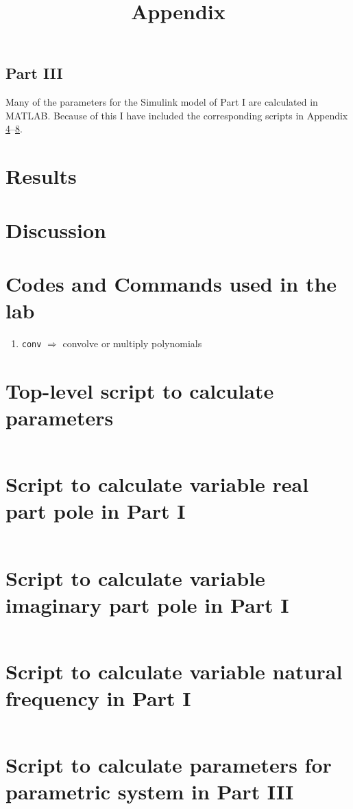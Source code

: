 \documentclass[11pt]{article}
\begin{document}
\begin{adjustwidth}{0.5in}{0in}
    \subsection{Part III}
    Many of the parameters for the Simulink model of Part I are calculated in MATLAB. Because of this I have included the corresponding scripts in Appendix \ref{apx:top param}--\ref{apx:last param}.

\end{adjustwidth}

\section{Results}
\section{Discussion}

\newpage
\appendix
\title{Appendix}\label{doc:apx}
\maketitle

\section{Codes and Commands used in the lab}

\begin{enumerate}
    \item
        \texttt{conv}
        \tabto{1.5in}
        \(\Rightarrow\) convolve or multiply polynomials
\end{enumerate}

\section{Top-level script to calculate parameters}\label{apx:top param}
\inputminted{matlab}{lab0405/programs/time_response_params_m1.m}

\section{Script to calculate variable real part pole in Part I}
\inputminted{matlab}{lab0405/programs/part0102_reals_m1.m}

\section{Script to calculate variable imaginary part pole in Part I}
\inputminted{matlab}{lab0405/programs/part0103_imags_m1.m}

\section{Script to calculate variable natural frequency in Part I}
\inputminted{matlab}{lab0405/programs/part0104_nat_freqs_m1.m}

\section{Script to calculate parameters for parametric system in Part III}\label{apx:last param}
\inputminted{matlab}{lab0405/programs/part03_params_m1.m}
\end{document}
